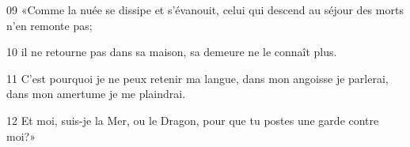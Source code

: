 
09 «Comme la nuée se dissipe et s’évanouit, celui qui descend au séjour des morts n’en remonte pas;

10 il ne retourne pas dans sa maison, sa demeure ne le connaît plus.

11 C’est pourquoi je ne peux retenir ma langue, dans mon angoisse je parlerai, dans mon amertume je me plaindrai.

12 Et moi, suis-je la Mer, ou le Dragon, pour que tu postes une garde contre moi?»